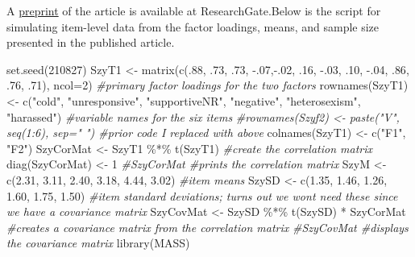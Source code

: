 \documentclass[
  english,
]{book}
\newenvironment{Shaded}{\begin{snugshade}}{\end{snugshade}}
\newcommand{\AttributeTok}[1]{\textcolor[rgb]{0.77,0.63,0.00}{#1}}
\newcommand{\CommentTok}[1]{\textcolor[rgb]{0.56,0.35,0.01}{\textit{#1}}}
\newcommand{\DecValTok}[1]{\textcolor[rgb]{0.00,0.00,0.81}{#1}}
\newcommand{\FloatTok}[1]{\textcolor[rgb]{0.00,0.00,0.81}{#1}}
\newcommand{\FunctionTok}[1]{\textcolor[rgb]{0.00,0.00,0.00}{#1}}
\newcommand{\NormalTok}[1]{#1}
\newcommand{\OtherTok}[1]{\textcolor[rgb]{0.56,0.35,0.01}{#1}}
\newcommand{\SpecialCharTok}[1]{\textcolor[rgb]{0.00,0.00,0.00}{#1}}
\newcommand{\StringTok}[1]{\textcolor[rgb]{0.31,0.60,0.02}{#1}}
\begin{document}
A \href{https://www.researchgate.net/publication/332062781_Perceptions_of_the_LGBTQ_College_Campus_Climate_Scale_Development_and_Psychometric_Evaluation/link/5ca0bef945851506d7377da7/download}{preprint} of the article is available at ResearchGate.Below is the script for simulating item-level data from the factor loadings, means, and sample size presented in the published article.

\begin{Shaded}
\begin{Highlighting}[]
\FunctionTok{set.seed}\NormalTok{(}\DecValTok{210827}\NormalTok{)}
\NormalTok{SzyT1 }\OtherTok{\textless{}{-}} \FunctionTok{matrix}\NormalTok{(}\FunctionTok{c}\NormalTok{(.}\DecValTok{88}\NormalTok{, .}\DecValTok{73}\NormalTok{, .}\DecValTok{73}\NormalTok{, }\SpecialCharTok{{-}}\NormalTok{.}\DecValTok{07}\NormalTok{,}\SpecialCharTok{{-}}\NormalTok{.}\DecValTok{02}\NormalTok{, .}\DecValTok{16}\NormalTok{, }\SpecialCharTok{{-}}\NormalTok{.}\DecValTok{03}\NormalTok{, .}\DecValTok{10}\NormalTok{, }\SpecialCharTok{{-}}\NormalTok{.}\DecValTok{04}\NormalTok{, .}\DecValTok{86}\NormalTok{, .}\DecValTok{76}\NormalTok{, .}\DecValTok{71}\NormalTok{), }\AttributeTok{ncol=}\DecValTok{2}\NormalTok{) }\CommentTok{\#primary factor loadings for the two factors}
\FunctionTok{rownames}\NormalTok{(SzyT1) }\OtherTok{\textless{}{-}} \FunctionTok{c}\NormalTok{(}\StringTok{"cold"}\NormalTok{, }\StringTok{"unresponsive"}\NormalTok{, }\StringTok{"supportiveNR"}\NormalTok{, }\StringTok{"negative"}\NormalTok{, }\StringTok{"heterosexism"}\NormalTok{, }\StringTok{"harassed"}\NormalTok{) }\CommentTok{\#variable names for the six items}
\CommentTok{\#rownames(Szyf2) \textless{}{-} paste("V", seq(1:6), sep=" ") \#prior code I replaced with above}
\FunctionTok{colnames}\NormalTok{(SzyT1) }\OtherTok{\textless{}{-}} \FunctionTok{c}\NormalTok{(}\StringTok{"F1"}\NormalTok{, }\StringTok{"F2"}\NormalTok{)}
\NormalTok{SzyCorMat }\OtherTok{\textless{}{-}}\NormalTok{ SzyT1 }\SpecialCharTok{\%*\%} \FunctionTok{t}\NormalTok{(SzyT1) }\CommentTok{\#create the correlation matrix}
\FunctionTok{diag}\NormalTok{(SzyCorMat) }\OtherTok{\textless{}{-}} \DecValTok{1}
\CommentTok{\#SzyCorMat \#prints the correlation matrix}
\NormalTok{SzyM }\OtherTok{\textless{}{-}} \FunctionTok{c}\NormalTok{(}\FloatTok{2.31}\NormalTok{, }\FloatTok{3.11}\NormalTok{, }\FloatTok{2.40}\NormalTok{, }\FloatTok{3.18}\NormalTok{, }\FloatTok{4.44}\NormalTok{, }\FloatTok{3.02}\NormalTok{) }\CommentTok{\#item means}
\NormalTok{SzySD }\OtherTok{\textless{}{-}} \FunctionTok{c}\NormalTok{(}\FloatTok{1.35}\NormalTok{, }\FloatTok{1.46}\NormalTok{, }\FloatTok{1.26}\NormalTok{, }\FloatTok{1.60}\NormalTok{, }\FloatTok{1.75}\NormalTok{, }\FloatTok{1.50}\NormalTok{) }\CommentTok{\#item standard deviations; turns out we won\textquotesingle{}t need these since we have a covariance matrix}
\NormalTok{SzyCovMat }\OtherTok{\textless{}{-}}\NormalTok{ SzySD }\SpecialCharTok{\%*\%} \FunctionTok{t}\NormalTok{(SzySD) }\SpecialCharTok{*}\NormalTok{ SzyCorMat }\CommentTok{\#creates a covariance matrix from the correlation matrix}
\CommentTok{\#SzyCovMat \#displays the covariance matrix}
\FunctionTok{library}\NormalTok{(MASS)}
\end{Highlighting}
\end{Shaded}
\end{document}
